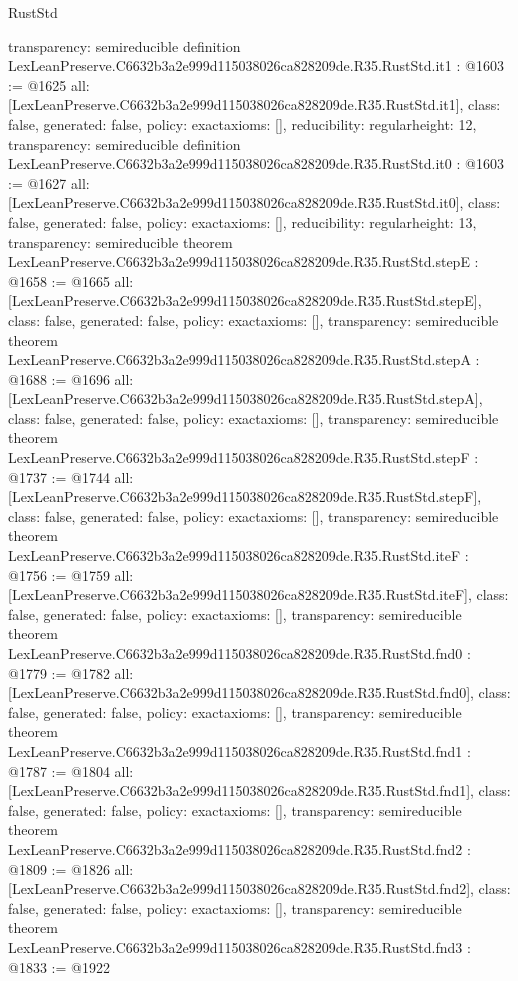 \begin{lexlean}{RustStd}
\begin{coremodule}
{  transparency: semireducible
}
definition LexLeanPreserve.C6632b3a2e999d115038026ca828209de.R35.RustStd.it1 : @1603 := @1625 {
  all: [LexLeanPreserve.C6632b3a2e999d115038026ca828209de.R35.RustStd.it1],
  class: false,
  generated: false,
  policy: exact{axioms: []},
  reducibility: regular{height: 12},
  transparency: semireducible
}
definition LexLeanPreserve.C6632b3a2e999d115038026ca828209de.R35.RustStd.it0 : @1603 := @1627 {
  all: [LexLeanPreserve.C6632b3a2e999d115038026ca828209de.R35.RustStd.it0],
  class: false,
  generated: false,
  policy: exact{axioms: []},
  reducibility: regular{height: 13},
  transparency: semireducible
}
theorem LexLeanPreserve.C6632b3a2e999d115038026ca828209de.R35.RustStd.stepE : @1658 := @1665 {
  all: [LexLeanPreserve.C6632b3a2e999d115038026ca828209de.R35.RustStd.stepE],
  class: false,
  generated: false,
  policy: exact{axioms: []},
  transparency: semireducible
}
theorem LexLeanPreserve.C6632b3a2e999d115038026ca828209de.R35.RustStd.stepA : @1688 := @1696 {
  all: [LexLeanPreserve.C6632b3a2e999d115038026ca828209de.R35.RustStd.stepA],
  class: false,
  generated: false,
  policy: exact{axioms: []},
  transparency: semireducible
}
theorem LexLeanPreserve.C6632b3a2e999d115038026ca828209de.R35.RustStd.stepF : @1737 := @1744 {
  all: [LexLeanPreserve.C6632b3a2e999d115038026ca828209de.R35.RustStd.stepF],
  class: false,
  generated: false,
  policy: exact{axioms: []},
  transparency: semireducible
}
theorem LexLeanPreserve.C6632b3a2e999d115038026ca828209de.R35.RustStd.iteF : @1756 := @1759 {
  all: [LexLeanPreserve.C6632b3a2e999d115038026ca828209de.R35.RustStd.iteF],
  class: false,
  generated: false,
  policy: exact{axioms: []},
  transparency: semireducible
}
theorem LexLeanPreserve.C6632b3a2e999d115038026ca828209de.R35.RustStd.fnd0 : @1779 := @1782 {
  all: [LexLeanPreserve.C6632b3a2e999d115038026ca828209de.R35.RustStd.fnd0],
  class: false,
  generated: false,
  policy: exact{axioms: []},
  transparency: semireducible
}
theorem LexLeanPreserve.C6632b3a2e999d115038026ca828209de.R35.RustStd.fnd1 : @1787 := @1804 {
  all: [LexLeanPreserve.C6632b3a2e999d115038026ca828209de.R35.RustStd.fnd1],
  class: false,
  generated: false,
  policy: exact{axioms: []},
  transparency: semireducible
}
theorem LexLeanPreserve.C6632b3a2e999d115038026ca828209de.R35.RustStd.fnd2 : @1809 := @1826 {
  all: [LexLeanPreserve.C6632b3a2e999d115038026ca828209de.R35.RustStd.fnd2],
  class: false,
  generated: false,
  policy: exact{axioms: []},
  transparency: semireducible
}
theorem LexLeanPreserve.C6632b3a2e999d115038026ca828209de.R35.RustStd.fnd3 : @1833 := @1922 {
}
\end{coremodule}
\end{lexlean}
